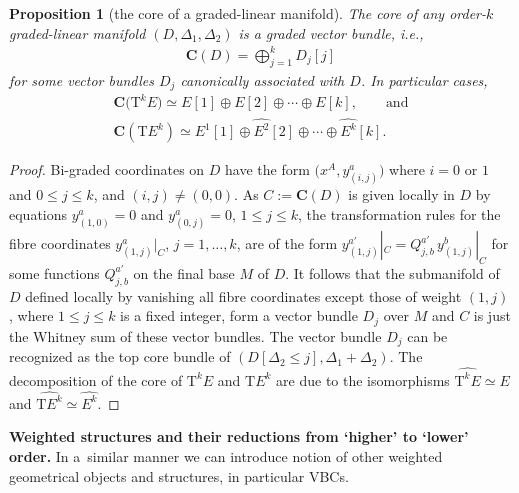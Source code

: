 \documentclass[10pt,a4paper]{amsart}
\newcommand{\ZM}{{VBC}} %
\newcommand{\degree}{{order}}
\newcommand{\T}{\mathrm{T}} %
\newcommand{\TT}[1]{\mathrm{T}^{#1}} %
\newcommand{\core}[1]{\widehat{#1}} %
\newcommand{\Core}{\mathbf{C}}
\numberwithin{equation}{section}
\newtheorem{prop}[thm]{Proposition}
\theoremstyle{definition}
\begin{document}
\begin{prop}[the core of a graded-linear manifold]\label{p:core_gr_lin_bndl} The core of any \degree-$k$ graded-linear manifold $(D, \Delta_1, \Delta_2)$ is a graded vector bundle, i.e.,
\begin{gather*}
\Core(D) = \bigoplus_{j=1}^k D_j[j]
\end{gather*}
for some vector bundles $D_j$ canonically associated with $D$. In particular cases,
\begin{gather*}
\Core\big(\TT{k} E\big) \simeq E[1]\oplus E[2] \oplus \cdots \oplus E[k], \qquad \text{and}\\
\Core(\T E^k) \simeq E^1[1] \oplus \core{E^2}[2] \oplus \cdots \oplus \core{E^k}[k].
\end{gather*}
\end{prop}
\begin{proof}Bi-graded coordinates on $D$ have the form $\big(x^A, y^a_{(i, j)}\big)$ where $i=0$ or $1$ and $0\leq j\leq k$, and $(i,j)\neq (0,0)$. As $C:= \Core(D)$ is given locally in $D$ by equations $y^a_{(1, 0)}=0$ and $y^a_{(0, j)}=0$, $1\leq j\leq k$, the transformation rules for the fibre coordinates $y^a_{(1, j)}|_{C}$, $j=1, \ldots, k$, are of the form $y^{a'}_{(1, j)}|_{C} = Q^{a'}_{j, b}\, y^b_{(1, j)}|_{C}$ for some functions $Q^{a'}_{j, b}$ on the final base $M$ of $D$. It follows that the submanifold of $D$ defined locally by vanishing all fibre coordinates except those of weight ${(1, j)}$, where $1\leq j\leq k$ is a fixed integer, form a vector bundle $D_j$ over $M$ and $C$ is just the Whitney sum of these vector bundles.
 The vector bundle $D_j$ can be recognized as the top core bundle of $(D[\Delta_2\leq j], \Delta_1+\Delta_2)$. The decomposition of the core of $\T^k E$ and $\T E^k$ are due to the isomorphisms $\core{\T^k E}\simeq E$ and $\core{\T E^k} \simeq \core{E^k}$. \end{proof}

{\bf Weighted structures and their reductions from `higher' to `lower' order.} In a~similar manner we can introduce notion of other weighted geometrical objects and structures, in particular \ZM s.
\end{document}
